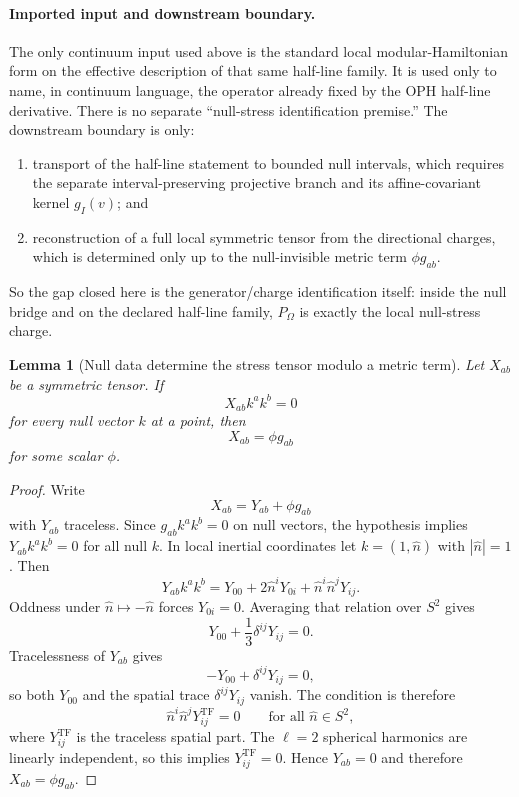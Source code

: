 \documentclass[11pt]{article}
\newtheorem{lemma}[theorem]{Lemma}
\begin{document}
\paragraph{Imported input and downstream boundary.}
The only continuum input used above is the standard local modular-Hamiltonian form on the effective description of that same half-line family. It is used only to name, in continuum language, the operator already fixed by the OPH half-line derivative. There is no separate ``null-stress identification premise.'' The downstream boundary is only:
\begin{enumerate}[label=(\roman*),leftmargin=2.2em]
\item transport of the half-line statement to bounded null intervals, which requires the separate interval-preserving projective branch and its affine-covariant kernel \(g_I(v)\); and
\item reconstruction of a full local symmetric tensor from the directional charges, which is determined only up to the null-invisible metric term \(\phi g_{ab}\).
\end{enumerate}
So the gap closed here is the generator/charge identification itself: inside the null bridge and on the declared half-line family, \(P_\Omega\) is exactly the local null-stress charge.

\begin{lemma}[Null data determine the stress tensor modulo a metric term]\label{lem:nullreconstruct}
Let \(X_{ab}\) be a symmetric tensor. If
\[
X_{ab}k^ak^b=0
\]
for every null vector \(k\) at a point, then
\[
X_{ab}=\phi g_{ab}
\]
for some scalar \(\phi\).
\end{lemma}

\begin{proof}
Write
\[
X_{ab}=Y_{ab}+\phi g_{ab}
\]
with \(Y_{ab}\) traceless. Since \(g_{ab}k^ak^b=0\) on null vectors, the hypothesis implies \(Y_{ab}k^ak^b=0\) for all null \(k\). In local inertial coordinates let \(k=(1,\hat n)\) with \(|\hat n|=1\). Then
\[
Y_{ab}k^ak^b
=
Y_{00}+2\hat n^iY_{0i}+\hat n^i\hat n^jY_{ij}.
\]
Oddness under \(\hat n\mapsto-\hat n\) forces \(Y_{0i}=0\). Averaging that relation over \(S^2\) gives
\[
Y_{00}+\frac13\delta^{ij}Y_{ij}=0.
\]
Tracelessness of \(Y_{ab}\) gives
\[
-Y_{00}+\delta^{ij}Y_{ij}=0,
\]
so both \(Y_{00}\) and the spatial trace \(\delta^{ij}Y_{ij}\) vanish. The condition is therefore
\[
\hat n^i\hat n^j Y_{ij}^{\mathrm{TF}}=0
\qquad
\text{for all }\hat n\in S^2,
\]
where \(Y_{ij}^{\mathrm{TF}}\) is the traceless spatial part. The \(\ell=2\) spherical harmonics are linearly independent, so this implies \(Y_{ij}^{\mathrm{TF}}=0\). Hence \(Y_{ab}=0\) and therefore \(X_{ab}=\phi g_{ab}\).
\end{proof}
\end{document}
